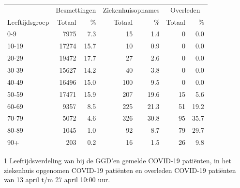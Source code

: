 \documentclass[
  english,
  man,floatsintext]{apa6}
\begin{document}
\begin{table}
\centering\begingroup\fontsize{11}{13}\selectfont

\begin{threeparttable}
\begin{tabular}{lrrrrrr}
\toprule
\multicolumn{1}{c}{ } & \multicolumn{2}{c}{Besmettingen} & \multicolumn{2}{c}{Ziekenhuisopnames} & \multicolumn{2}{c}{Overleden} \\
\cmidrule(l{3pt}r{3pt}){2-3} \cmidrule(l{3pt}r{3pt}){4-5} \cmidrule(l{3pt}r{3pt}){6-7}
Leeftijdsgroep & Totaal & \% & Totaal & \% & Totaal & \%\\
\midrule
0-9 & 7975 & 7.3 & 15 & 1.4 & 0 & 0.0\\
10-19 & 17274 & 15.7 & 10 & 0.9 & 0 & 0.0\\
20-29 & 19472 & 17.7 & 27 & 2.6 & 0 & 0.0\\
30-39 & 15627 & 14.2 & 40 & 3.8 & 0 & 0.0\\
40-49 & 16496 & 15.0 & 100 & 9.5 & 0 & 0.0\\
50-59 & 17471 & 15.9 & 207 & 19.6 & 15 & 5.6\\
60-69 & 9357 & 8.5 & 225 & 21.3 & 51 & 19.2\\
70-79 & 5072 & 4.6 & 326 & 30.8 & 95 & 35.7\\
80-89 & 1045 & 1.0 & 92 & 8.7 & 79 & 29.7\\
90+ & 203 & 0.2 & 16 & 1.5 & 26 & 9.8\\
\bottomrule
\end{tabular}
\begin{tablenotes}
\item[1] Leeftijdsverdeling van bij de GGD’en gemelde COVID-19 patiënten, in het ziekenhuis opgenomen COVID-19 patiënten en overleden COVID-19 patiënten van 13 april t/m 27 april 10:00 uur.
\end{tablenotes}
\end{threeparttable}
\endgroup{}
\end{table}

\newpage
\end{document}
